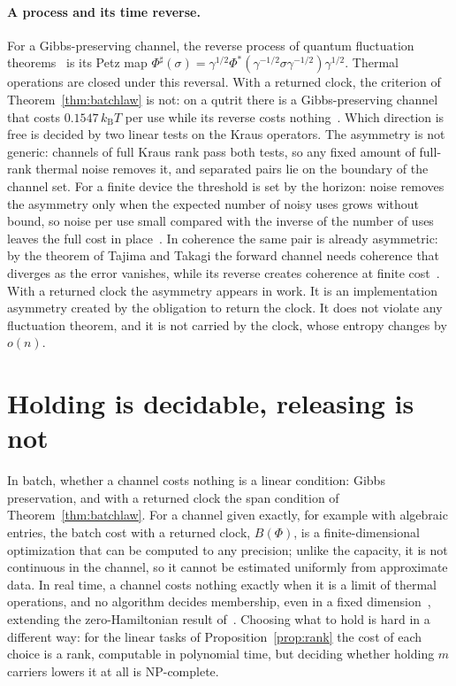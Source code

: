 \documentclass[11pt]{article}
\theoremstyle{definition}
\theoremstyle{remark}
\newcommand{\kB}{k_{\mathrm B}}
\begin{document}
\paragraph{A process and its time reverse.} For a Gibbs-preserving channel, the reverse process of quantum fluctuation theorems~\cite{Crooks08,KwonKim19} is its Petz map $\Phi^\sharp(\sigma)=\gamma^{1/2}\Phi^*(\gamma^{-1/2}\sigma\gamma^{-1/2})\gamma^{1/2}$. Thermal operations are closed under this reversal. With a returned clock, the criterion of Theorem~\ref{thm:batchlaw} is not: on a qutrit there is a Gibbs-preserving channel that costs $0.1547\,\kB T$ per use while its reverse costs nothing~\cite{KeepingTime}. Which direction is free is decided by two linear tests on the Kraus operators. The asymmetry is not generic: channels of full Kraus rank pass both tests, so any fixed amount of full-rank thermal noise removes it, and separated pairs lie on the boundary of the channel set. For a finite device the threshold is set by the horizon: noise removes the asymmetry only when the expected number of noisy uses grows without bound, so noise per use small compared with the inverse of the number of uses leaves the full cost in place~\cite{KeepingTime}. In coherence the same pair is already asymmetric: by the theorem of Tajima and Takagi the forward channel needs coherence that diverges as the error vanishes, while its reverse creates coherence at finite cost~\cite{TajimaTakagi25}. With a returned clock the asymmetry appears in work. It is an implementation asymmetry created by the obligation to return the clock. It does not violate any fluctuation theorem, and it is not carried by the clock, whose entropy changes by $o(n)$.

\section{Holding is decidable, releasing is not}\label{sec:computability}

In batch, whether a channel costs nothing is a linear condition: Gibbs preservation, and with a returned clock the span condition of Theorem~\ref{thm:batchlaw}. For a channel given exactly, for example with algebraic entries, the batch cost with a returned clock, $B(\Phi)$, is a finite-dimensional optimization that can be computed to any precision; unlike the capacity, it is not continuous in the channel, so it cannot be estimated uniformly from approximate data. In real time, a channel costs nothing exactly when it is a limit of thermal operations, and no algorithm decides membership, even in a fixed dimension~\cite{SaveWork}, extending the zero-Hamiltonian result of~\cite{Flagship}. Choosing what to hold is hard in a different way: for the linear tasks of Proposition~\ref{prop:rank} the cost of each choice is a rank, computable in polynomial time, but deciding whether holding $m$ carriers lowers it at all is NP-complete.
\end{document}
